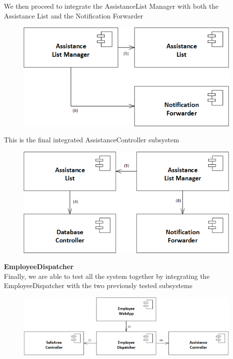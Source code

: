 \documentclass{article}
\begin{document}
We then proceed to integrate the AssistanceList Manager with both the Assistance List and the Notification Forwarder
\begin{figure}[H]
\includegraphics[scale=0.5]{Assistance/Assistance3}
\centering
\end{figure}
This is the final integrated AssistanceController subsystem
\begin{figure}[H]
\includegraphics[scale=0.5]{Assistance/AssistanceControllerIntegration}
\centering
\end{figure}
\textbf{EmployeeDispatcher}
\\
Finally, we are able to test all the system together by integrating the EmployeeDispatcher with the two previously tested subsystems
\begin{figure}[H]
\includegraphics[scale=0.5]{Images/Employee/EmployeeAppIntegration}
\centering
\end{figure}
\newpage
\end{document}
